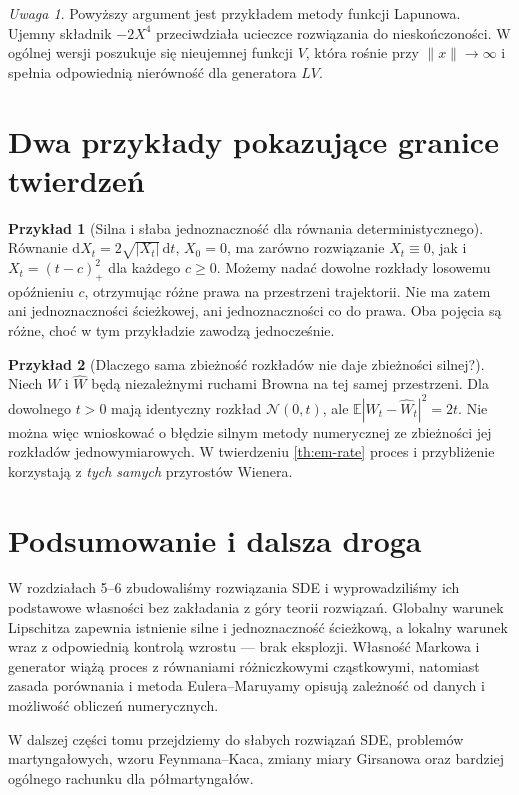 \documentclass[11pt,a4paper,oneside]{report}
\numberwithin{equation}{chapter}
\theoremstyle{plain}
\theoremstyle{definition}
\newtheorem{przyklad}{Przykład}[chapter]
\theoremstyle{remark}
\newtheorem{uwaga}{Uwaga}[chapter]
\newcommand{\E}{\mathbb{E}}
\newcommand{\dd}{\mathrm{d}}
\newcommand{\norm}[1]{\lVert #1\rVert}
\newcommand{\Normal}{\mathcal{N}}
\begin{document}
\begin{uwaga}
Powyższy argument jest przykładem metody funkcji
Lapunowa. Ujemny składnik $-2X^4$ przeciwdziała
ucieczce rozwiązania do nieskończoności. W ogólnej
wersji poszukuje się nieujemnej funkcji $V$, która
rośnie przy $\norm{x}\to\infty$ i spełnia odpowiednią
nierówność dla generatora $LV$.
\end{uwaga}

\section{Dwa przykłady pokazujące granice twierdzeń}\label{sec:volIII:06:08}
\begin{przyklad}[Silna i słaba jednoznaczność dla równania deterministycznego]
Równanie $\dd X_t=2\sqrt{|X_t|}\,\dd t$, $X_0=0$,
ma zarówno rozwiązanie $X_t\equiv0$, jak i
$X_t=(t-c)_+^2$ dla każdego $c\ge0$.
Możemy nadać dowolne rozkłady losowemu opóźnieniu $c$,
otrzymując różne prawa na przestrzeni trajektorii.
Nie ma zatem ani jednoznaczności ścieżkowej, ani
jednoznaczności co do prawa. Oba pojęcia są różne,
choć w tym przykładzie zawodzą jednocześnie.
\end{przyklad}
\begin{przyklad}[Dlaczego sama zbieżność rozkładów nie daje zbieżności silnej?]
Niech $W$ i $\widehat W$ będą niezależnymi ruchami Browna
na tej samej przestrzeni. Dla dowolnego $t>0$ mają identyczny
rozkład $\Normal(0,t)$, ale
$\E|W_t-\widehat W_t|^2=2t$.
Nie można więc wnioskować o błędzie silnym metody
numerycznej ze zbieżności jej rozkładów jednowymiarowych.
W twierdzeniu \ref{th:em-rate} proces i przybliżenie
korzystają z \emph{tych samych} przyrostów Wienera.
\end{przyklad}

\section{Podsumowanie i dalsza droga}\label{sec:volIII:06:09}
W rozdziałach 5--6 zbudowaliśmy rozwiązania SDE i
wyprowadziliśmy ich podstawowe własności bez
zakładania z góry teorii rozwiązań. Globalny warunek
Lipschitza zapewnia istnienie silne i jednoznaczność
ścieżkową, a lokalny warunek wraz z odpowiednią
kontrolą wzrostu — brak eksplozji. Własność Markowa
i generator wiążą proces z równaniami różniczkowymi
cząstkowymi, natomiast zasada porównania i metoda
Eulera--Maruyamy opisują zależność od danych i
możliwość obliczeń numerycznych.

W dalszej części tomu przejdziemy do słabych
rozwiązań SDE, problemów martyngałowych, wzoru
Feynmana--Kaca, zmiany miary Girsanowa oraz
bardziej ogólnego rachunku dla półmartyngałów.
\end{document}
